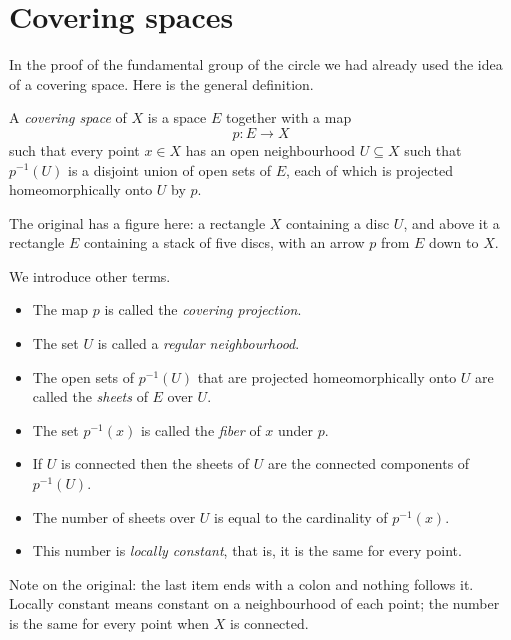 \section{Covering spaces}
\label{section-covering-spaces}

\noindent
In the proof of the fundamental group of
the circle we had already used the idea
of a covering space. Here is the general
definition.

\begin{definition}
\label{definition-covering-space}
A {\it covering space} of $X$ is a space
$E$ together with a map
$$
p:E\to X
$$
such that every point $x\in X$ has an
open neighbourhood $U\subseteq X$ such
that $p^{-1}(U)$ is a disjoint union of
open sets of $E$, each of which is
projected homeomorphically onto $U$ by
$p$.
\end{definition}

The original has a figure here: a
rectangle $X$ containing a disc $U$, and
above it a rectangle $E$ containing a
stack of five discs, with an arrow $p$
from $E$ down to $X$.

We introduce other terms.
\begin{itemize}
\item The map $p$ is called the
{\it covering projection}.
\item The set $U$ is called a
{\it regular neighbourhood}.
\item The open sets of $p^{-1}(U)$ that
are projected homeomorphically onto $U$
are called the {\it sheets} of $E$ over
$U$.
\item The set $p^{-1}(x)$ is called the
{\it fiber} of $x$ under $p$.
\end{itemize}

\begin{remark}
\label{remark-sheets}
\begin{itemize}
\item If $U$ is connected then the
sheets of $U$ are the connected
components of $p^{-1}(U)$.
\item The number of sheets over $U$ is
equal to the cardinality of $p^{-1}(x)$.
\item This number is {\it locally
constant}, that is, it is the same for
every point.
\end{itemize}
Note on the original: the last item
ends with a colon and nothing follows
it. Locally constant means constant on
a neighbourhood of each point; the
number is the same for every point when
$X$ is connected.
\end{remark}

